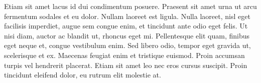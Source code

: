 \documentclass[12pt,letterpaper,notitlepage]{report}
\begin{document}
Etiam sit amet lacus id dui condimentum posuere. Praesent sit amet urna ut arcu fermentum sodales et eu dolor. Nullam laoreet est ligula. Nulla laoreet, nisl eget facilisis imperdiet, augue sem congue enim, et tincidunt ante odio eget felis. Ut nisi diam, auctor ac blandit ut, rhoncus eget mi. Pellentesque elit quam, finibus eget neque et, congue vestibulum enim. Sed libero odio, tempor eget gravida ut, scelerisque et ex. Maecenas feugiat enim et tristique euismod. Proin accumsan turpis vel hendrerit placerat. Etiam sit amet leo nec eros cursus suscipit. Proin tincidunt eleifend dolor, eu rutrum elit molestie at.



\end{document}
